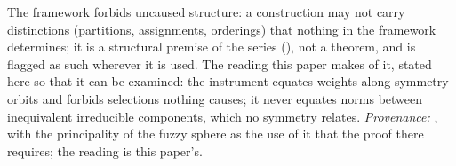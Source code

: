 The framework forbids uncaused structure: a construction may not carry distinctions (partitions, assignments, orderings) that nothing in the framework determines; it is a structural premise of the series (), not a theorem, and is flagged as such wherever it is used. The reading this paper makes of it, stated here so that it can be examined: the instrument equates weights along symmetry orbits and forbids selections nothing causes; it never equates norms between inequivalent irreducible components, which no symmetry relates. \emph{Provenance:} \cite[Principle~5.4]{ButlerT8}, with the principality of the fuzzy sphere \cite[Thm.~5.5]{ButlerT8} as the use of it that the proof there requires; the reading is this paper's.
